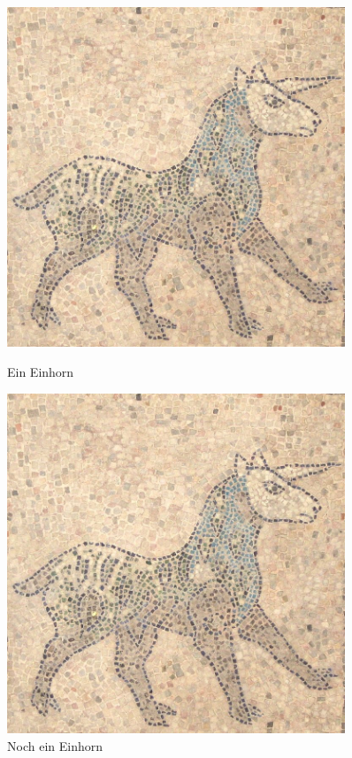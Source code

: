 \documentclass[]{scrreprt}
\begin{document}
\begin{figure}[h!]
\begin{minipage}[hbt]{0.5\textwidth}
\centering
\includegraphics[width=0.9\textwidth]{einhorn.jpg}
\caption{Ein Einhorn}
\label{fig:einhorn1}
\end{minipage}
\hfil
\begin{minipage}[hbt]{0.5\textwidth}
\centering
\includegraphics[width=0.9\textwidth]{einhorn.jpg}
\caption{Noch ein Einhorn}
\label{fig:einhorn2}
\end{minipage}
\end{figure}
\end{document}
